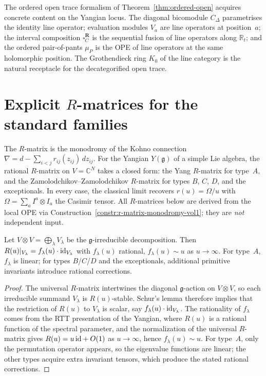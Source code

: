\begin{remark}
\label{rem:eval-open-trace}
The ordered open trace formalism of
Theorem~\ref{thm:ordered-open} acquires concrete content
on the Yangian locus. The diagonal bicomodule $C_\Delta$
parametrises the identity line operator; evaluation modules
$V_a$ are line operators at position~$a$; the interval
composition $\square_C^{\mathbf{R}}$ is the sequential
fusion of line operators along $\mathbb{R}_t$; and the
ordered pair-of-pants $\mu_P$ is the OPE of line operators
at the same holomorphic position. The Grothendieck ring
$K_0$ of the line category is the natural receptacle for
the decategorified open trace.
\end{remark}



\section{Explicit $R$-matrices for the standard families}
\label{sec:explicit-r-matrices}

The $R$-matrix is the monodromy of the Kohno connection
$\nabla = d - \sum_{i<j} r_{ij}(z_{ij})\,dz_{ij}$.
For the Yangian $Y(\mathfrak{g})$ of a simple Lie algebra,
the rational $R$-matrix on $V = \mathbb{C}^N$ takes a closed form:
the Yang $R$-matrix for type~$A$, and the
Zamolodchikov--Zamolodchikov $R$-matrix for types $B$, $C$, $D$,
and the exceptionals. In every case, the classical limit
recovers $r(u) = \Omega/u$ with $\Omega = \sum_a I^a \otimes I_a$
the Casimir tensor. All $R$-matrices below are derived from the
local OPE via Construction~\ref{constr:r-matrix-monodromy-vol1};
they are \emph{not} independent input.

\begin{proposition}
\label{prop:r-matrix-eigenvalue}
Let $V \otimes V = \bigoplus_\lambda V_\lambda$ be the
$\mathfrak{g}$-irreducible decomposition. Then
$R(u)|_{V_\lambda} = f_\lambda(u)\cdot\mathrm{id}_{V_\lambda}$
with $f_\lambda(u)$ rational, $f_\lambda(u) \sim u$ as
$u \to \infty$. For type~$A$, $f_\lambda$ is linear;
for types $B$/$C$/$D$ and the exceptionals, additional
primitive invariants introduce rational corrections.
\end{proposition}

\begin{proof}
The universal $R$-matrix intertwines the diagonal
$\mathfrak{g}$-action on $V\otimes V$, so each irreducible summand
$V_\lambda$ is $R(u)$-stable.
Schur's lemma therefore implies that the restriction of $R(u)$ to
$V_\lambda$ is scalar, say $f_\lambda(u)\cdot\mathrm{id}_{V_\lambda}$.
The rationality of $f_\lambda$ comes from the RTT presentation of the
Yangian, where $R(u)$ is a rational function of the spectral
parameter, and the normalization of the universal $R$-matrix gives
$R(u)=u\,\mathrm{id}+O(1)$ as $u\to\infty$, hence $f_\lambda(u)\sim u$.
For type~$A$, only the permutation operator appears, so the eigenvalue
functions are linear; the other types acquire extra invariant tensors,
which produce the stated rational corrections.
\end{proof}

